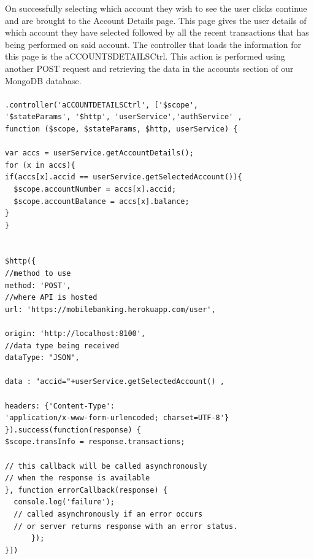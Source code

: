 On successfully selecting which account they wish to see the user clicks continue and are brought to the Account Details page. This page gives the user details of which account they have selected followed by all the recent transactions that has being performed on said account. The controller that loads the information for this page is the aCCOUNTSDETAILSCtrl. This action is performed using another POST request and retrieving the data in the accounts section of our MongoDB database.\paragraph{}
\begin{verbatim}
.controller('aCCOUNTDETAILSCtrl', ['$scope',
'$stateParams', '$http', 'userService','authService' ,
function ($scope, $stateParams, $http, userService) {

var accs = userService.getAccountDetails();
for (x in accs){
if(accs[x].accid == userService.getSelectedAccount()){
  $scope.accountNumber = accs[x].accid;
  $scope.accountBalance = accs[x].balance;
}
}


$http({
//method to use
method: 'POST',
//where API is hosted
url: 'https://mobilebanking.herokuapp.com/user',

origin: 'http://localhost:8100',
//data type being received
dataType: "JSON",

data : "accid="+userService.getSelectedAccount() ,

headers: {'Content-Type': 
'application/x-www-form-urlencoded; charset=UTF-8'}
}).success(function(response) {
$scope.transInfo = response.transactions;

// this callback will be called asynchronously
// when the response is available
}, function errorCallback(response) {
  console.log('failure');
  // called asynchronously if an error occurs
  // or server returns response with an error status.
      });
}])
\end{verbatim}


